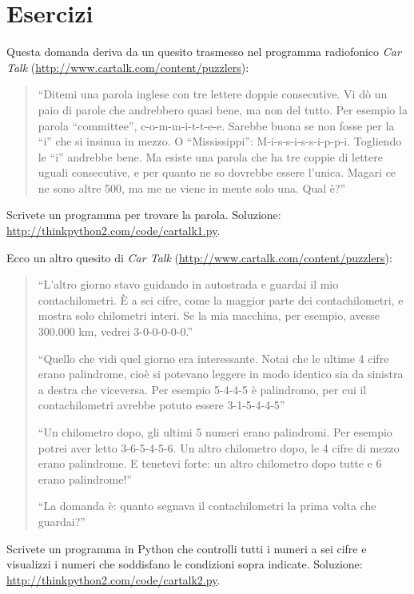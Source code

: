 \documentclass[10pt]{book}
\begin{document}
\section{Esercizi}

\begin{exercise}

Questa domanda deriva da un quesito trasmesso nel programma radiofonico {\em Car Talk} 
(\url{http://www.cartalk.com/content/puzzlers}):

\begin{quote}
``Ditemi una parola inglese con tre lettere doppie consecutive. Vi dò un paio di parole che andrebbero quasi bene, ma non del tutto. Per esempio la parola ``committee'', c-o-m-m-i-t-t-e-e. Sarebbe buona se non fosse per la ``i'' che si insinua in mezzo. O ``Mississippi'': M-i-s-s-i-s-s-i-p-p-i. Togliendo le ``i'' andrebbe bene. Ma esiste una parola che ha tre coppie di lettere uguali consecutive, e per quanto ne so dovrebbe essere l'unica. Magari ce ne sono altre 500, ma me ne viene in mente solo una. Qual è?''
\end{quote}

Scrivete un programma per trovare la parola.  Soluzione: \url{http://thinkpython2.com/code/cartalk1.py}.

\end{exercise}

\vspace{0.2in}
\begin{exercise}
Ecco un altro quesito di {\em Car Talk}
(\url{http://www.cartalk.com/content/puzzlers}):

\begin{quote}
``L'altro giorno stavo guidando in autostrada e guardai il mio contachilometri. È a sei cifre, come la maggior parte dei contachilometri, e mostra solo chilometri interi. Se la mia macchina, per esempio, avesse 300.000 km, vedrei 3-0-0-0-0-0.''

``Quello che vidi quel giorno era interessante. Notai che le ultime 4 cifre erano palindrome, cioè si potevano leggere in modo identico sia da sinistra a destra che viceversa. Per esempio 5-4-4-5 è palindromo, per cui il contachilometri avrebbe potuto essere 3-1-5-4-4-5''

``Un chilometro dopo, gli ultimi 5 numeri erano palindromi. Per esempio potrei aver letto 3-6-5-4-5-6. Un altro chilometro dopo, le 4 cifre di mezzo erano palindrome. E tenetevi forte: un altro chilometro dopo tutte e 6 erano palindrome!''

``La domanda è: quanto segnava il contachilometri la prima volta che guardai?''
\end{quote}

Scrivete un programma in Python che controlli tutti i numeri a sei cifre e visualizzi i numeri che soddisfano le condizioni sopra indicate. Soluzione: \url{http://thinkpython2.com/code/cartalk2.py}.

\end{exercise}
\end{document}
